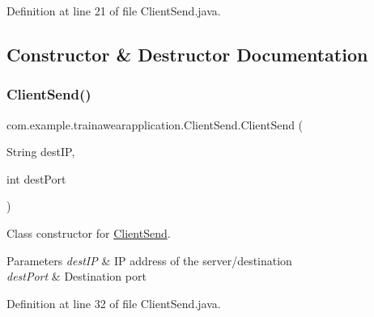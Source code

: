 Definition at line 21 of file Client\+Send.\+java.



\subsection{Constructor \& Destructor Documentation}
\mbox{\label{classcom_1_1example_1_1trainawearapplication_1_1_client_send_ab1f011085d4305f586a7074a46e73450}} 
\subsubsection{\texorpdfstring{ClientSend()}{ClientSend()}}
{\footnotesize\ttfamily com.\+example.\+trainawearapplication.\+Client\+Send.\+Client\+Send (\begin{DoxyParamCaption}\item[{String}]{dest\+IP,  }\item[{int}]{dest\+Port }\end{DoxyParamCaption})}



Class constructor for \mbox{\hyperlink{classcom_1_1example_1_1trainawearapplication_1_1_client_send}{Client\+Send}}. 


\begin{DoxyParams}{Parameters}
{\em dest\+IP} & IP address of the server/destination \\
\hline
{\em dest\+Port} & Destination port \\
\hline
\end{DoxyParams}


Definition at line 32 of file Client\+Send.\+java.


\begin{DoxyCode}{0}

\end{DoxyCode}


